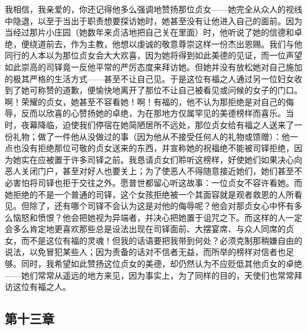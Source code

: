 我相信，我亲爱的，你还记得他多么强调地赞扬那位贞女——她完全从众人的视线中隐退，以至于当出于职责想要探访她时，她甚至没有让他进入自己的面前。因为当经过那片小庄园（她数年来贞洁地把自己关在里面）时，他听说了她的信德和卓绝，便绕道前去，作为主教，他想以虔诚的敬意尊崇这样一份杰出恩赐。我们与他同行的人本以为那位贞女会大大欢喜，因为她将得到如此美德的见证，而一位声望如此崇高的司铎竟一反他平常的严厉态度来拜访她。但她并没有放松她对自己施加的极其严格的生活方式——甚至不让自己见。于是这位有福之人通过另一位妇女收到了她可称赞的道歉，便愉快地离开了那位不让自己被看见或问候的女子的门口。啊！荣耀的贞女，她甚至不容看她！啊！有福的，他不认为那拒绝是对自己的侮辱，反而以欣喜的心赞扬她的卓绝，为在那地方仅属罕见的美德榜样而喜乐。当时，夜幕降临，迫使我们停宿在她简陋居所不远处，那位贞女给有福之人送来了一份礼物；做了一件他从没做过的事（因为他从不接受任何人的礼物或馈赠）：他一点也没有拒绝那位可敬的贞女送来的东西，并宣称她的祝福绝不能被司铎拒绝，因为她实在应被置于许多司铎之前。我恳请贞女们聆听这榜样，好使她们如果决心向恶人关闭门户，甚至对好人也要关上；为了使恶人不得随意接近她们，她们甚至不必害怕将司铎也拒于交往之外。愿普世都留心听这故事：一位贞女不容许看她。而她拒绝的不是一个普通的司铎，这个女孩拒绝被一个其面容就是观者救恩的人所看见。但除了，还有哪个司铎不会认为这是对他的侮辱呢？他会对那贞女心中怀有多么恼怒和愤恨？他会把她视为异端者，并决心把她置于诅咒之下。而这样的人一定会多么肯定地更喜欢那些总是设法出现在司铎面前、大摆宴席、与众人同席的贞女，而不是这位有福的灵魂！但我的话语要把我带到何处？必须克制那稍嫌自由的说法，以免冒犯某些人；因为责备的话对不信者无益，而所举的榜样对信者也足够。同时，我希望如此赞扬这位贞女的美德，却仍然认为不应贬低其他贞女的卓绝——她们常常从遥远的地方来见，因为事实上，为了同样的目的，天使们也常常拜访这位有福之人。\par


\subsection{第十三章}

